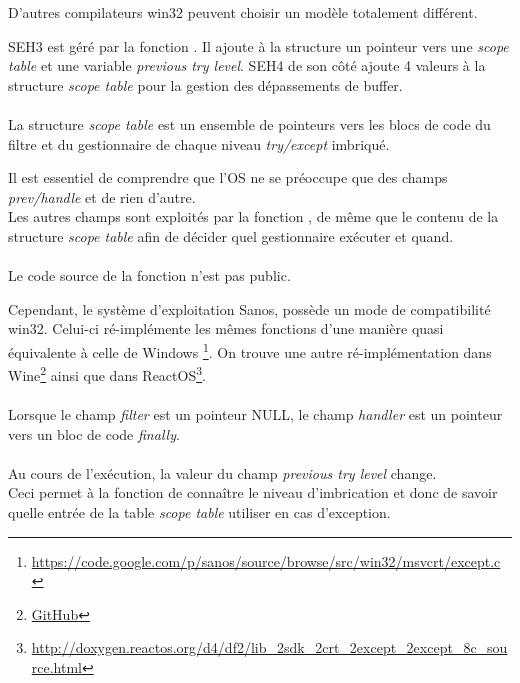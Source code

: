 D'autres compilateurs win32 peuvent choisir un modèle totalement différent.


SEH3 est géré par la fonction . Il ajoute à la structure 
un pointeur vers une \emph{scope table} et une variable \emph{previous try level}.
SEH4 de son côté ajoute 4 valeurs à la structure \emph{scope table} pour la gestion des dépassements
de buffer.\\
\\
La structure \emph{scope table} est un ensemble de pointeurs vers les blocs de code du filtre et du
gestionnaire de chaque niveau \emph{try/except} imbriqué.



Il est essentiel de comprendre que l'\ac{OS} ne se préoccupe que des champs \emph{prev/handle} et de
rien d'autre.\\
Les autres champs sont exploités par la fonction , de même que le contenu
de la structure \emph{scope table} afin de décider quel gestionnaire exécuter et quand.\\
\\
Le code source de la fonction  n'est pas public.

Cependant, le système d'exploitation Sanos, possède un mode de compatibilité win32.
Celui-ci ré-implémente les mêmes fonctions d'une manière quasi équivalente à celle de Windows
\footnote{\url{https://code.google.com/p/sanos/source/browse/src/win32/msvcrt/except.c}}.
On trouve une autre ré-implémentation dans Wine\footnote{\href{https://github.com/mirrors/wine/blob/master/dlls/msvcrt/except_i386.c}{GitHub}}
ainsi que dans ReactOS\footnote{\url{http://doxygen.reactos.org/d4/df2/lib_2sdk_2crt_2except_2except_8c_source.html}}.\\
\\
Lorsque le champ \emph{filter} est un pointeur NULL, le champ \emph{handler} est un pointeur vers un
bloc de code \emph{finally}.\\
\\
Au cours de l'exécution, la valeur du champ \emph{previous try level} change. \\
Ceci permet à la
fonction  de connaître le niveau d'imbrication et donc de savoir quelle
entrée de la table \emph{scope table} utiliser en cas d'exception.


